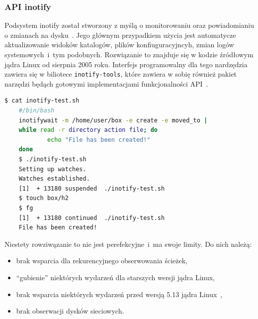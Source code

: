 \subsubsection{API inotify}
\label{sec:inotify}
Podsystem inotify został stworzony z myślą o monitorowaniu oraz powiadomianiu o zmianach na dysku~\cite{love_linux_2013}. 
Jego głównym przypadkiem użycia jest automatycze aktualizowanie widoków katalogów, plików konfiuguracyjncyh, zmian
logów systemowych~i~tym podobnych. Rozwiązanie to znajduje się w kodzie źródłowym jądra Linux od sierpnia 2005 roku. Interfejs programowalny
dla tego nardzędzia zawiera się w biliotece \texttt{inotify-tools}, które zawiera w sobię również pakiet narzędzi będąch gotowymi implementacjami funkcjonalności API~\cite{biancalana_inotfy}.
\begin{lstlisting}[language=bash,
    backgroundcolor=\color{EEGold!5!white},
    caption={Przykład użycia narzędzia \texttt{inotifywait}.
    Po utworzeniu pliku ukazała się odpowiednia wiadomość},
    label={lst:helloC}]
    $ cat inotify-test.sh
    #/bin/bash
    inotifywait -m /home/user/box -e create -e moved_to |
    while read -r directory action file; do
            echo "File has been created!"
    done
    $ ./inotify-test.sh
    Setting up watches.
    Watches established.
    [1]  + 13180 suspended  ./inotify-test.sh
    $ touch box/h2
    $ fg
    [1]  + 13180 continued  ./inotify-test.sh
    File has been created!
\end{lstlisting}
Niestety rowziwązanie to nie jest perefekcyjne~i~ma swoje limity. Do nich należą:
\begin{itemize}
    \item brak wsparcia dla rekurencyjnego obserwowania ścieżek,
    \item \enquote{gubienie} niektórych wydarzeń dla starszych wersji jądra Linux,
    \item brak wsparcia niektórych wydarzeń przed wersją 5.13 jądra Linux~\cite{fanotify7},
    \item brak obserwacji dysków sieciowych.
\end{itemize}
\newpage
